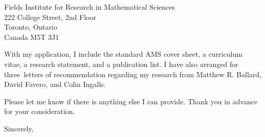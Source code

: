 \documentclass[10pt]{letter}
\def\materials{the standard AMS cover sheet,
  a curriculum vitae,
  a research statement,
  and a publication list}
\def\contacts{Manuel Reyes}
\def\numresrefs{three}
\def\numteachrefs{one}
\def\refs{Matthew R. Ballard, David Favero, and Colin Ingalls}
\def\teachingrefs{Matthew Boylan}
\begin{document}
\begin{letter}{
    Fields Institute for Research in Mathematical Sciences\\
    222 College Street, 2nd Floor\\
    Toronto, Ontario\\
    Canada M5T 3J1
}
  


  With my application, I include \materials.
  I have also arranged for \numresrefs\ letters of recommendation regarding my research from \refs.

  
  Please let me know if there is anything else I can provide.
  Thank you in advance for your consideration.
  \closing{Sincerely,}
\end{letter}
\end{document}
